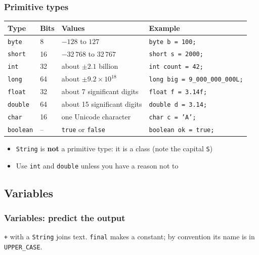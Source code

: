 \documentclass[aspectratio=169,10pt,compress]{beamer}
\begin{document}
\begin{frame}[t,fragile] \frametitle{Primitive types}
  \small
  \begin{tabular}{@{}L{0.13\textwidth}L{0.1\textwidth}L{0.33\textwidth}L{0.36\textwidth}@{}}
    \toprule
    \textbf{Type} & \textbf{Bits} & \textbf{Values} & \textbf{Example} \\
    \midrule
    \texttt{byte}    & 8  & $-128$ to $127$                  & \texttt{byte b = 100;} \\
    \texttt{short}   & 16 & $-32\,768$ to $32\,767$          & \texttt{short s = 2000;} \\
    \texttt{int}     & 32 & about $\pm 2.1$ billion          & \texttt{int count = 42;} \\
    \texttt{long}    & 64 & about $\pm 9.2 \times 10^{18}$   & \texttt{long big = 9\_000\_000\_000L;} \\
    \texttt{float}   & 32 & about 7 significant digits       & \texttt{float f = 3.14f;} \\
    \texttt{double}  & 64 & about 15 significant digits      & \texttt{double d = 3.14;} \\
    \texttt{char}    & 16 & one Unicode character            & \texttt{char c = 'A';} \\
    \texttt{boolean} & -- & \texttt{true} or \texttt{false}  & \texttt{boolean ok = true;} \\
    \bottomrule
  \end{tabular}

  \vspace{0.6em}
  \begin{itemize}
    \item \texttt{String} is \textbf{not} a primitive type: it is a class (note the capital \texttt{S})
    \item Use \texttt{int} and \texttt{double} unless you have a reason not to
  \end{itemize}
\end{frame}

\subsection[Variables]{Variables}




\begin{frame}[t,fragile] \frametitle{Variables: predict the output}

  \small \texttt{+} with a \texttt{String} joins text. \texttt{final} makes a constant; by convention its name is in \texttt{UPPER\_CASE}.
\end{frame}
\end{document}
